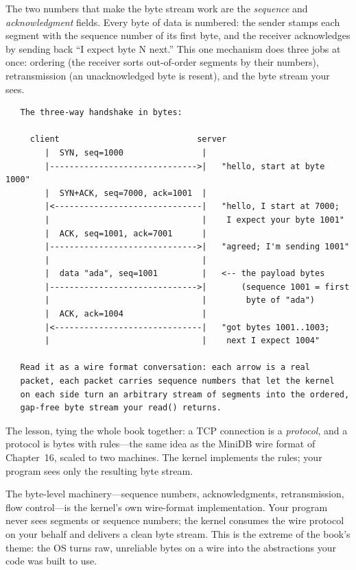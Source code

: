 The two numbers that make the byte stream work are the
\emph{sequence} and \emph{acknowledgment} fields. Every byte of data
is numbered: the sender stamps each segment with the sequence number
of its first byte, and the receiver acknowledges by sending back
``I expect byte N next.'' This one mechanism does three jobs at once:
ordering (the receiver sorts out-of-order segments by their numbers),
retransmission (an unacknowledged byte is resent), and the byte
stream your  sees.

\begin{verbatim}
   The three-way handshake in bytes:

     client                            server
        |  SYN, seq=1000                |
        |------------------------------>|   "hello, start at byte 1000"
        |  SYN+ACK, seq=7000, ack=1001  |
        |<------------------------------|   "hello, I start at 7000;
        |                               |    I expect your byte 1001"
        |  ACK, seq=1001, ack=7001      |
        |------------------------------>|   "agreed; I'm sending 1001"
        |                               |
        |  data "ada", seq=1001         |   <-- the payload bytes
        |------------------------------>|       (sequence 1001 = first
        |                               |        byte of "ada")
        |  ACK, ack=1004                |
        |<------------------------------|   "got bytes 1001..1003;
        |                               |    next I expect 1004"

   Read it as a wire format conversation: each arrow is a real
   packet, each packet carries sequence numbers that let the kernel
   on each side turn an arbitrary stream of segments into the ordered,
   gap-free byte stream your read() returns.
\end{verbatim}

The lesson, tying the whole book together: a TCP connection is a
\emph{protocol}, and a protocol is bytes with rules---the same idea as
the MiniDB wire format of Chapter~16, scaled to two machines. The
kernel implements the rules; your program sees only the resulting byte
stream.

\begin{osconcept}
The byte-level machinery---sequence numbers, acknowledgments,
retransmission, flow control---is the kernel's own wire-format
implementation. Your program never sees segments or sequence numbers;
the kernel consumes the wire protocol on your behalf and delivers a
clean byte stream. This is the extreme of the book's theme: the OS
turns raw, unreliable bytes on a wire into the abstractions your code
was built to use.
\end{osconcept}

